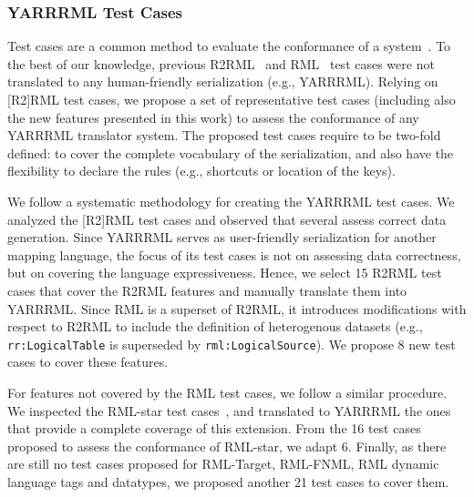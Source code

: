 \subsubsection{YARRRML Test Cases} %
Test cases are a common method to evaluate the conformance of a system~\citep{arenas2023morphstar,heyvaert2019conformance}. 
To the best of our knowledge, previous R2RML~\citep{boris2012r2rml} and RML~\citep{heyvaert2019conformance} test cases were not translated to any human-friendly serialization (e.g., YARRRML).
Relying on [R2]RML test cases, we propose a set of representative test cases (including also the new features presented in this work) to assess the conformance of any YARRRML translator system.
The proposed test cases require to be two-fold defined: to cover the complete vocabulary of the serialization, and also have the flexibility to declare the rules (e.g., shortcuts or location of the keys). 

We follow a systematic methodology for creating the YARRRML test cases. 
We analyzed the [R2]RML test cases and observed that several assess correct data generation.
Since YARRRML serves as user-friendly serialization for another mapping language, the focus of its test cases is not on assessing data correctness, but on covering the language expressiveness.
Hence, we select 15 R2RML test cases that cover the R2RML features and manually translate them into YARRRML. 
Since RML is a superset of R2RML, it introduces modifications with respect to R2RML to include the definition of heterogenous datasets (e.g., \texttt{rr:LogicalTable} is superseded by \texttt{rml:LogicalSource}). %
We propose 8 new test cases to cover these features. 

For features not covered by the RML test cases, we follow a similar procedure. 
We inspected the RML-star test cases~\citep{david_chaves_2022_6518802}, and translated to YARRRML the ones that provide a complete coverage of this extension. 
From the 16 test cases proposed to assess the conformance of RML-star, we adapt 6. 
Finally, as there are still no test cases proposed for RML-Target, RML-FNML, RML dynamic language tags and datatypes, we 
proposed another 21 test cases to cover them.

